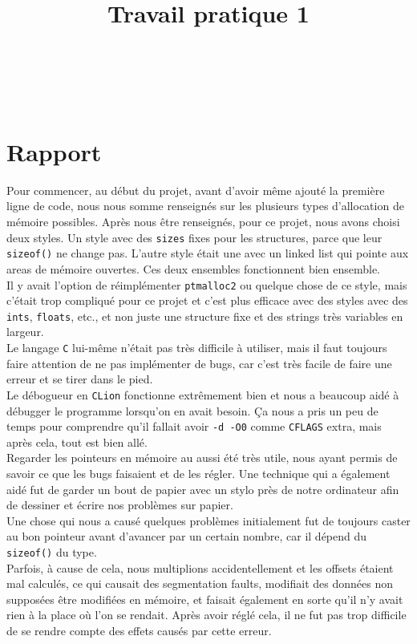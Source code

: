 \documentclass[10pt,a4paper]{article}
\title{Travail pratique 1}
\author{
\nomcompletUn\\
\matriculeUn\\
\nomcompletDeux\\
\matriculeDeux
}
\date{}
\begin{document}
\maketitle

\section*{Rapport}

Pour commencer, au début du projet, avant d'avoir même ajouté la première ligne 
de code, nous nous somme renseignés sur les plusieurs types d'allocation de mémoire
possibles. Après nous être renseignés, pour ce projet, nous avons choisi deux styles. Un style avec des \texttt{sizes} fixes
pour les structures, parce que leur \texttt{sizeof()} ne change pas. L'autre style était une avec 
un linked list qui pointe aux areas de mémoire ouvertes. Ces deux ensembles 
fonctionnent bien ensemble.\\
Il y avait l'option de réimplémenter \texttt{ptmalloc2} ou
quelque chose de ce style, mais c'était trop compliqué pour ce projet et c'est plus
efficace avec des styles avec des \texttt{ints}, \texttt{floats}, etc., et non juste une structure fixe
et des strings très variables en largeur.\\

Le langage \texttt{C} lui-même n'était pas très difficile à utiliser, mais il faut toujours faire
attention de ne pas implémenter de bugs, car c'est très facile de faire une erreur et se tirer dans 
le pied.\\

Le débogueur en \texttt{CLion} fonctionne extrêmement bien et nous
a beaucoup aidé à débugger le programme lorsqu'on en avait besoin. Ça nous a pris un
peu de temps pour comprendre qu'il fallait avoir \texttt{-d -O0} comme \texttt{CFLAGS} extra, mais après cela,
tout est bien allé.\\

Regarder les pointeurs en mémoire au aussi été très utile, nous ayant permis de
savoir ce que les bugs faisaient et de les régler. Une technique qui a également aidé fut
de garder un bout de papier avec un stylo près de notre ordinateur afin de dessiner et 
écrire nos problèmes sur papier.\\

Une chose qui nous a causé quelques problèmes initialement fut
de toujours caster au bon pointeur avant d'avancer par un certain nombre,
car il dépend du \texttt{sizeof()} du type.\\
Parfois, à cause de cela, nous multiplions accidentellement
et les offsets étaient mal calculés, ce qui causait des segmentation faults,
modifiait des données non supposées être modifiées en mémoire, et faisait également en sorte qu'il
n'y avait rien à la place où l'on se rendait. Après avoir réglé cela, il ne fut pas trop
difficile de se rendre compte des effets causés par cette erreur.\\
\end{document}
